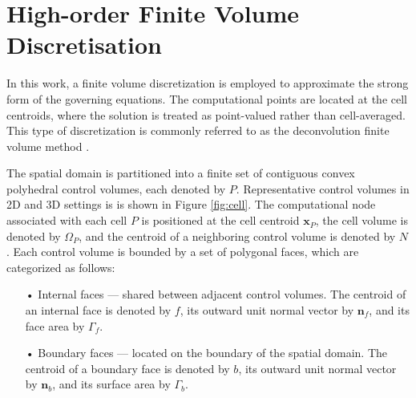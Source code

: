 \documentclass[sn-mathphys,Numbered]{sn-jnl}%
\newcommand{\bb}{\boldsymbol}
\begin{document}
\section{High-order Finite Volume Discretisation}
\label{sec:math_model}
%
%
In this work, a finite volume discretization is employed to approximate the strong form of the governing equations. 
The computational points are located at the cell centroids, where the solution is treated as point-valued rather than cell-averaged. 
This type of discretization is commonly referred to as the deconvolution finite volume method \cite{Nishikawa2025, Nishikawa2021}.

The spatial domain is partitioned into a finite set of contiguous convex polyhedral control volumes, each denoted by $P$.
Representative control volumes in 2D and 3D settings is is shown in Figure \ref{fig:cell}. 
The computational node associated with each cell $P$ is positioned at the cell centroid $\bb{x}_P$, the cell volume is denoted by $\Omega_P$,
and the centroid of a neighboring control volume is denoted by $N$.
Each control volume is bounded by a set of polygonal faces, which are categorized as follows:
\begin{itemize}
\item[•] Internal faces — shared between adjacent control volumes. The centroid of an internal face is denoted by $f$, its outward unit normal vector by $\bb{n}_f$, and its face area by $\Gamma_f$.
\item[• ] Boundary faces — located on the boundary of the spatial domain. The centroid of a boundary face is denoted by $b$, its outward unit normal vector by $\bb{n}_b$, and its surface area by $\Gamma_b$. 
\end{itemize}
\end{document}
